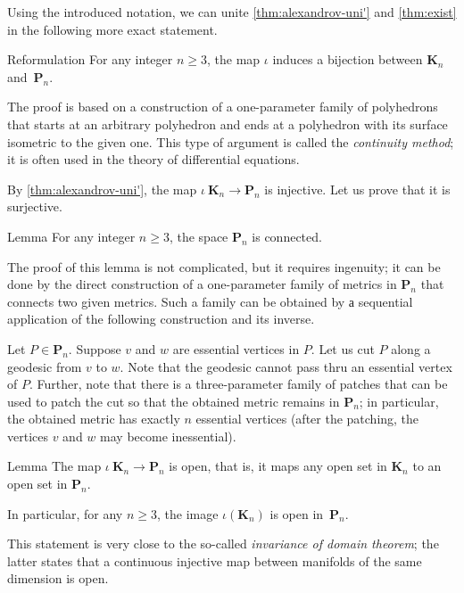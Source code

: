 Using the introduced notation, we can unite \ref{thm:alexandrov-uni'} and \ref{thm:exist} in the following more exact statement.

\begin{thm}{Reformulation}
For any integer $n\ge 3$,
the map $\iota$ induces a bijection between $\mathbf{K}_n$ and~$\mathbf{P}_n$.
\end{thm}

The proof is based on a construction of a one-parameter family of polyhedrons that starts at an arbitrary polyhedron
and ends at a polyhedron with its surface isometric to the given one.
This type of argument is called the \textit{continuity method}; it is often used in the theory of differential equations.


By \ref{thm:alexandrov-uni'}, the map $\iota\:\mathbf{K}_n\to\mathbf{P}_n$ is injective.
Let us prove that it is surjective.

\begin{thm}{Lemma}
For any integer $n\ge 3$, the space $\mathbf{P}_n$ is connected.
\end{thm}

The proof of this lemma is not complicated, but it requires ingenuity;
it can be done by the direct construction of a one-parameter family of metrics in $\mathbf{P}_n$ that connects two given metrics.
Such a family can be obtained by а sequential application of the following construction and its inverse.

Let $P\in\mathbf{P}_n$.
Suppose $v$ and $w$ are essential vertices in $P$.
Let us cut $P$ along a geodesic from $v$ to $w$.
Note that the geodesic cannot pass thru an essential vertex of $P$.
Further, note that there is a three-parameter family of patches that can be used to patch the cut so that the obtained metric remains in $\mathbf{P}_n$;
in particular, the obtained metric has exactly $n$ essential vertices (after the patching, the vertices $v$ and $w$ may become inessential).


\begin{thm}{Lemma}
The map $\iota\:\mathbf{K}_n\to\mathbf{P}_n$ is open, 
that is, it maps any open set in $\mathbf{K}_n$ to an open set in $\mathbf{P}_n$.

In particular, for any $n\ge 3$, the image $\iota(\mathbf{K}_n)$ is open in~$\mathbf{P}_n$.
\end{thm}

This statement is very close to the so-called \textit{invariance of domain theorem};
the latter states that a continuous injective map between manifolds of the same dimension is open.

